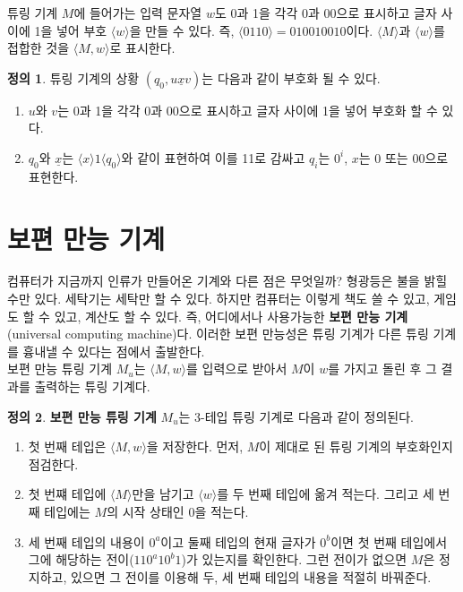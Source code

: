 \documentclass[b5paper, 11pt]{book}
\theoremstyle{definition}
\newtheorem{defn}{정의}[chapter]
\begin{document}
튜링 기계 $M$에 들어가는 입력 문자열 $w$도 0과 1을 각각 0과 00으로 표시하고 글자 사이에 1을 넣어 
부호 $\langle w \rangle$을 만들 수 있다. 즉, $\langle 0110 \rangle = 010010010$이다. $\langle M \rangle$과
$\langle w \rangle$를 접합한 것을 $\langle M, w \rangle$로 표시한다.
\begin{defn}
    튜링 기계의 상황 $(q_0, u\underline{x}v)$는 다음과 같이 부호화 될 수 있다.
    \begin{enumerate}
        \item $u$와 $v$는 0과 1을 각각 0과 00으로 표시하고 글자 사이에 1을 넣어 부호화 할 수 있다.
        \item $q_0$와 $\underline{x}$는 $\langle x\rangle 1 \langle q_0\rangle$와 같이 표현하여 이를 11로 감싸고 $q_i$는 $0^i$, $x$는 0 또는 00으로 표현한다.
    \end{enumerate}
\end{defn} 
\section{보편 만능 기계}
컴퓨터가 지금까지 인류가 만들어온 기계와 다른 점은 무엇일까? 형광등은 불을 밝힐 수만 있다. 세탁기는 세탁만 할 수 있다.
하지만 컴퓨터는 이렇게 책도 쓸 수 있고, 게임도 할 수 있고, 계산도 할 수 있다. 즉, 어디에서나 사용가능한 
\textbf{보편 만능 기계}(universal computing machine)다. 이러한 보편 만능성은 튜링 기계가 다른 튜링 기계를 흉내낼 수 있다는 점에서 출발한다. \\ 
보편 만능 튜링 기계 $M_u$는 $\langle M, w\rangle$를 입력으로 받아서 $M$이 $w$를 가지고 돌린 후
그 결과를 출력하는 튜링 기계다. 
\begin{defn}
    \textbf{보편 만능 튜링 기계} $M_u$는 3-테입 튜링 기계로 다음과 같이 정의된다.
    \begin{enumerate}
        \item 첫 번째 테입은 $\langle M, w \rangle$을 저장한다. 먼저, $M$이 제대로 된 튜링 기계의
        부호화인지 점검한다. 
        \item 첫 번쨰 테입에 $\langle M \rangle$만을 남기고 $\langle w \rangle$를
        두 번째 테입에 옮겨 적는다. 그리고 세 번째 테입에는 $M$의 시작 상태인 $0$을 적는다. 
        \item 세 번째 테입의 내용이 $0^a$이고 둘째 테입의 현재 글자가 $0^b$이면 첫 번째 테입에서
        그에 해당하는 전이($110^a10^b1$)가 있는지를 확인한다. 그런 전이가 없으면 $M$은 정지하고, 있으면
        그 전이를 이용해 두, 세 번째 테입의 내용을 적절히 바꿔준다. 
    \end{enumerate}
\end{defn}
\end{document}
